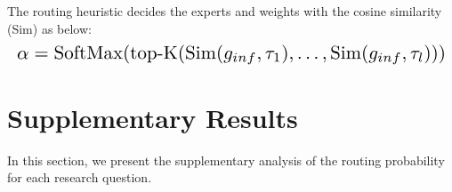 The routing heuristic decides the experts and weights with the cosine similarity (Sim) as below:
\begin{equation*}
    \resizebox{\columnwidth}{!}{%
        $\alpha = \text{SoftMax}(\text{top-K}(\text{Sim}(g_{inf}, \tau_1), \dots, \text{Sim}(g_{inf}, \tau_l)))$%
        }
\end{equation*}




\section{Supplementary Results}
\label{sec:supp_routing}

In this section, we present the supplementary analysis of the routing probability for each research question.

